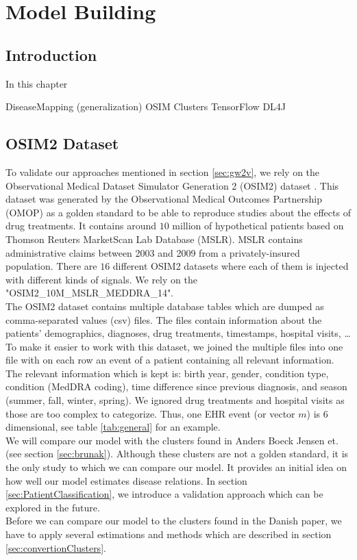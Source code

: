 \graphicspath{ {Implementation/Images/} }


\chapter{Model Building}
\label{cha:implementation}

\section{Introduction}
In this chapter 

DiseaseMapping (generalization)
OSIM
Clusters
TensorFlow
DL4J

\section{OSIM2 Dataset}

To validate our approaches mentioned in section \ref{sec:gw2v}, we rely on the Observational Medical Dataset Simulator Generation 2 (OSIM2) dataset \cite{OSIM:online}. This dataset was generated by the Observational Medical Outcomes Partnership (OMOP) as a golden standard to be able to reproduce studies about the effects of drug treatments. It contains around $10$ million of hypothetical patients based on Thomson Reuters MarketScan Lab Database (MSLR). MSLR contains administrative claims between 2003 and 2009 from a privately-insured population. There are $16$ different OSIM2 datasets where each of them is injected with different kinds of signals. We rely on the "OSIM2\_10M\_MSLR\_MEDDRA\_14". \\

The OSIM2 dataset contains multiple database tables which are dumped as comma-separated values (csv) files. The files contain information about the patients' demographics, diagnoses, drug treatments, timestamps, hospital visits, \ldots \\
To make it easier to work with this dataset, we joined the multiple files into one file with on each row an event of a patient containing all relevant information. The relevant information which is kept is: birth year, gender, condition type, condition (MedDRA coding), time difference since previous diagnosis, and season (summer, fall, winter, spring). We ignored drug treatments and hospital visits as those are too complex to categorize. Thus, one EHR event (or vector $m$) is $6$ dimensional, see table \ref{tab:general} for an example. \\	

We will compare our model with the clusters found in Anders Boeck Jensen et. \cite{Brunak:article} (see section \ref{sec:brunak}). Although these clusters are not a golden standard, it is the only study to which we can compare our model. It provides an initial idea on how well our model estimates disease relations. In section \ref{sec:PatientClassification}, we introduce a validation approach which can be explored in the future. \\
Before we can compare our model to the clusters found in the Danish paper, we have to apply several estimations and methods which are described in section \ref{sec:convertionClusters}.


